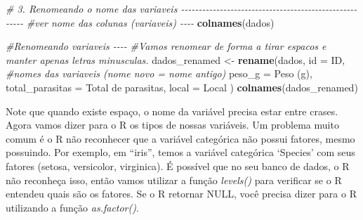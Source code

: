 \documentclass[
]{book}
\newenvironment{Shaded}{\begin{snugshade}}{\end{snugshade}}
\newcommand{\AttributeTok}[1]{\textcolor[rgb]{0.13,0.29,0.53}{#1}}
\newcommand{\CommentTok}[1]{\textcolor[rgb]{0.56,0.35,0.01}{\textit{#1}}}
\newcommand{\FunctionTok}[1]{\textcolor[rgb]{0.13,0.29,0.53}{\textbf{#1}}}
\newcommand{\NormalTok}[1]{#1}
\newcommand{\OtherTok}[1]{\textcolor[rgb]{0.56,0.35,0.01}{#1}}
\newcommand{\SpecialCharTok}[1]{\textcolor[rgb]{0.81,0.36,0.00}{\textbf{#1}}}
\newcommand{\StringTok}[1]{\textcolor[rgb]{0.31,0.60,0.02}{#1}}
\begin{document}
\begin{Shaded}
\begin{Highlighting}[]

\CommentTok{\# 3. Renomeando o nome das variaveis {-}{-}{-}{-}{-}{-}{-}{-}{-}{-}{-}{-}{-}{-}{-}{-}{-}{-}{-}{-}{-}{-}{-}{-}{-}{-}{-}{-}{-}{-}{-}{-}{-}{-}{-}{-}{-}{-}{-}{-}{-}{-}{-}{-}{-}{-}{-}{-}{-}{-}{-}{-}{-}{-}{-}}
\CommentTok{\#ver nome das colunas (variaveis) {-}{-}{-}{-}}
\FunctionTok{colnames}\NormalTok{(dados)}

\CommentTok{\#Renomeando variaveis {-}{-}{-}{-}}
\CommentTok{\#Vamos renomear de forma a tirar espacos e manter apenas letras minusculas.}
\NormalTok{dados\_renamed }\OtherTok{\textless{}{-}} \FunctionTok{rename}\NormalTok{(dados,           }
                        \AttributeTok{id =}\NormalTok{ ID,  }\CommentTok{\#nomes das variaveis (nome novo = nome antigo)}
                        \AttributeTok{peso\_g  =} \StringTok{\textasciigrave{}}\AttributeTok{Peso (g)}\StringTok{\textasciigrave{}}\NormalTok{,}
                        \AttributeTok{total\_parasitas =} \StringTok{\textasciigrave{}}\AttributeTok{Total de parasitas}\StringTok{\textasciigrave{}}\NormalTok{,}
                        \AttributeTok{local  =}\NormalTok{ Local}
\NormalTok{                        )}
\FunctionTok{colnames}\NormalTok{(dados\_renamed)}
\end{Highlighting}
\end{Shaded}

Note que quando existe espaço, o nome da variável precisa estar entre crases.
Agora vamos dizer para o R os tipos de nossas variáveis. Um problema muito comum é o R não reconhecer que a variável categórica não possui fatores, mesmo possuindo. Por exemplo, em ``iris'', temos a variável categórica `Species' com seus fatores (setosa, versicolor, virginica). É possível que no seu banco de dados, o R não reconheça isso, então vamos utilizar a função \emph{levels()} para verificar se o R entendeu quais são os fatores. Se o R retornar NULL, você precisa dizer para o R utilizando a função \emph{as.factor()}.

\begin{Shaded}
\end{Shaded}
\end{document}
